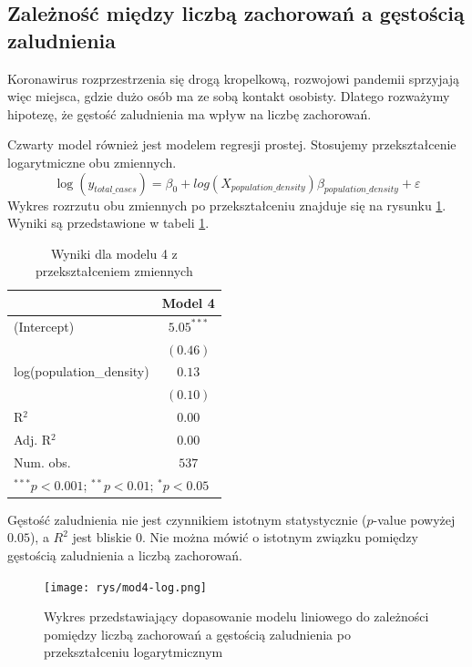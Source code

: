 \documentclass[12pt]{mwbk}
\theoremstyle{plain}
\theoremstyle{definition}
\theoremstyle{definition}
\newcommand\zrodlo[1]{\par\vspace{-3mm}{\small\textit{Źródło: }#1 }}
\begin{document}
\subsection{Zależność między liczbą zachorowań a gęstością zaludnienia}

Koronawirus rozprzestrzenia się drogą kropelkową, rozwojowi pandemii sprzyjają więc miejsca, gdzie dużo osób ma ze sobą kontakt osobisty. Dlatego rozważymy hipotezę, że gęstość zaludnienia ma wpływ na liczbę zachorowań.

Czwarty model również jest modelem regresji prostej. Stosujemy przekształcenie logarytmiczne obu zmiennych.
$$\log(y_{total\_cases})=\beta_0+log(X_{population\_density})\beta_{population\_density}+\varepsilon$$
 Wykres rozrzutu obu zmiennych po przekształceniu znajduje się na rysunku \ref{fig:mod4-lin}.
Wyniki są przedstawione w tabeli \ref{table:mod4}.

\begin{table}[!htbp]
	\begin{center}
		\begin{tabular}{l c}
			\hline
			& Model 4 \\
			\hline
			(Intercept)              & $5.05^{***}$ \\
			& $(0.46)$     \\
			log(population\_density) & $0.13$       \\
			& $(0.10)$     \\
			\hline
			R$^2$                    & $0.00$       \\
			Adj. R$^2$               & $0.00$       \\
			Num. obs.                & $537$        \\
			\hline
			\multicolumn{2}{l}{\scriptsize{$^{***}p<0.001$; $^{**}p<0.01$; $^{*}p<0.05$}}
		\end{tabular}
		\caption{Wyniki dla modelu 4 z przekształceniem zmiennych}
		\label{table:mod4}
	\end{center}
\end{table}

Gęstość zaludnienia nie jest czynnikiem istotnym statystycznie ($p$-value powyżej $0.05$), a $R^2$ jest bliskie 0. Nie można mówić o istotnym związku pomiędzy gęstością zaludnienia a liczbą zachorowań.

\begin{figure}[!ht]
	\centering
	\texttt{[image: rys/mod4-log.png]}
	\caption{Wykres przedstawiający dopasowanie modelu liniowego do zależności pomiędzy liczbą zachorowań a gęstością zaludnienia po przekształceniu logarytmicznym }
	\label{fig:mod4-lin}
	\zrodlo{Opracowanie własne}
\end{figure}
\end{document}
